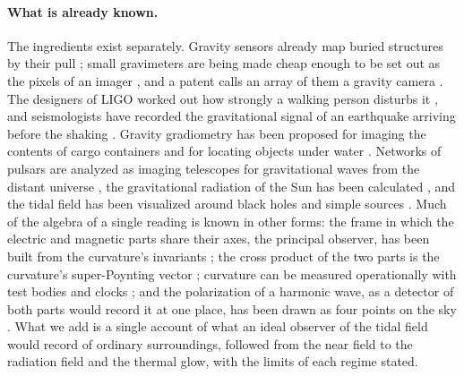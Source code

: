 \paragraph{What is already known.} The ingredients exist separately. Gravity
sensors already map buried structures by their pull \cite{Stray2022}; small
gravimeters are being made cheap enough to be set out as the pixels of an
imager \cite{Middlemiss2016,Prasad2021}, and a patent calls an array of them a
gravity camera \cite{JordanHowell2021}. The designers of LIGO worked out how strongly a walking
person disturbs it \cite{ThorneWinstein1999}, and seismologists have recorded
the gravitational signal of an earthquake arriving before the shaking
\cite{Vallee2017}. Gravity gradiometry has been proposed for imaging the contents
of cargo containers \cite{Kirkendall2007} and for locating objects under water
\cite{WuTian2010}. Networks of pulsars are analyzed as imaging telescopes for
gravitational waves from the distant universe \cite{BoylePen2012}, the
gravitational radiation of the Sun has been calculated
\cite{GarciaCelyRingwald2025,Steane2024}, and the tidal field has been
visualized around black holes and simple sources \cite{Nichols2011}. Much of
the algebra of a single reading is known in other forms: the frame in which the
electric and magnetic parts share their axes, the principal observer, has been
built from the curvature's invariants
\cite{CostaWyllemanNatario2021,WyllemanCostaNatario2021}; the
cross product of the two parts is the curvature's super-Poynting vector
\cite{MaartensBassett1998}; curvature can be measured operationally with test
bodies and clocks \cite{ObukhovPuetzfeld2019}; and the
polarization of a harmonic wave, as a detector of both parts would record it at
one place, has been drawn as four points on the sky \cite{Bruno2019}. What we
add is a single account of what an ideal observer of the tidal field would
record of ordinary surroundings, followed from the near field to the radiation
field and the thermal glow, with the limits of each regime stated.
